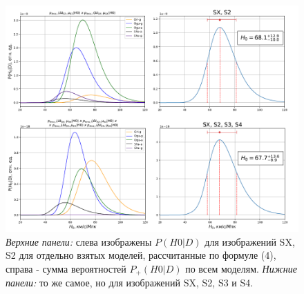 \begin{figure}[H]
    \centering
	\includegraphics[width=0.99\linewidth]{pics/H0-all.png}
	\caption{\textit{Верхние панели:} слева изображены $P( H0 |D)$ для изображений SX, S2 для отдельно взятых моделей, рассчитанные по формуле (4), справа - сумма вероятностей $P_{+}( H0 |D)$ по всем моделям. \textit{Нижние панели:} то же самое, но для изображений SX, S2, S3 и S4.}
	\label{fig:probs2}
\end{figure}


